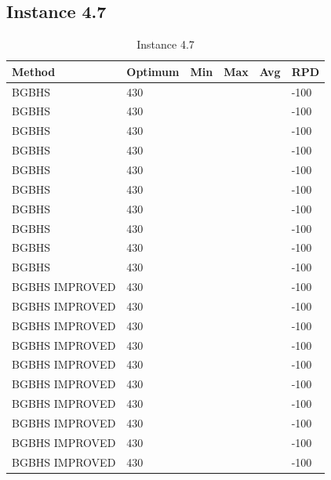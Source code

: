 \subsection{Instance 4.7}
\begin{table}[H]
\centering
\begin{tabular}{ | l | l | l | l | l | l | }
\hline
	Method & Optimum & Min & Max & Avg & RPD \\ \hline
	BGBHS & 430 &  &  &  & -100 \\ \hline
	BGBHS & 430 &  &  &  & -100 \\ \hline
	BGBHS & 430 &  &  &  & -100 \\ \hline
	BGBHS & 430 &  &  &  & -100 \\ \hline
	BGBHS & 430 &  &  &  & -100 \\ \hline
	BGBHS & 430 &  &  &  & -100 \\ \hline
	BGBHS & 430 &  &  &  & -100 \\ \hline
	BGBHS & 430 &  &  &  & -100 \\ \hline
	BGBHS & 430 &  &  &  & -100 \\ \hline
	BGBHS & 430 &  &  &  & -100 \\ \hline
	BGBHS IMPROVED & 430 &  &  &  & -100 \\ \hline
	BGBHS IMPROVED & 430 &  &  &  & -100 \\ \hline
	BGBHS IMPROVED & 430 &  &  &  & -100 \\ \hline
	BGBHS IMPROVED & 430 &  &  &  & -100 \\ \hline
	BGBHS IMPROVED & 430 &  &  &  & -100 \\ \hline
	BGBHS IMPROVED & 430 &  &  &  & -100 \\ \hline
	BGBHS IMPROVED & 430 &  &  &  & -100 \\ \hline
	BGBHS IMPROVED & 430 &  &  &  & -100 \\ \hline
	BGBHS IMPROVED & 430 &  &  &  & -100 \\ \hline
	BGBHS IMPROVED & 430 &  &  &  & -100 \\ \hline
\end{tabular}

\caption{Instance 4.7}
\label{tblscp47}
\end{table}
\newpage

